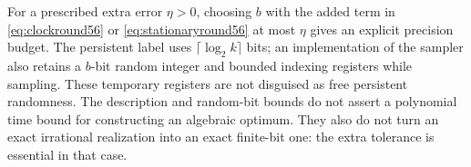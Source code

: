 For a prescribed extra error $\eta>0$, choosing $b$ with the added term in \eqref{eq:clockround56} or \eqref{eq:stationaryround56} at most $\eta$ gives an explicit precision budget. The persistent label uses $\lceil\log_2k\rceil$ bits; an implementation of the sampler also retains a $b$-bit random integer and bounded indexing registers while sampling. These temporary registers are not disguised as free persistent randomness. The description and random-bit bounds do not assert a polynomial time bound for constructing an algebraic optimum. They also do not turn an exact irrational realization into an exact finite-bit one: the extra tolerance is essential in that case.
